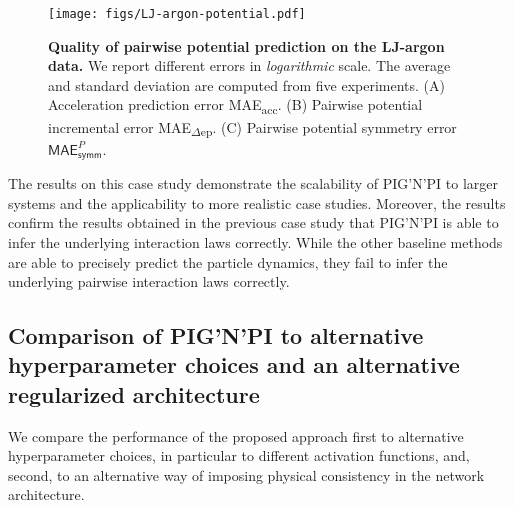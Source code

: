 \documentclass{article}
\newcommand{\pignpi}{PIG'N'PI\xspace}
\begin{document}
\begin{figure}[h!]
    \centering
    \texttt{[image: figs/LJ-argon-potential.pdf]}
    \caption{\textbf{Quality of pairwise potential prediction on the LJ-argon data.} We report different errors in \emph{logarithmic} scale. The average and standard deviation are computed from five experiments. (A) Acceleration prediction error \textsf{MAE\textsubscript{acc}}. (B) Pairwise potential incremental error \textsf{MAE\textsubscript{$\Delta$ep}}. (C) Pairwise potential symmetry error $\textsf{MAE}_\textsf{symm}^{P}$.}
    \label{fig:LJ-argon-potential}
\end{figure}


The results on this case study demonstrate the scalability of \pignpi to larger systems and the applicability to more realistic case studies. Moreover, the results confirm the results obtained in the previous case study that \pignpi is able to infer the underlying interaction laws correctly. While the other baseline methods are able to precisely predict the particle dynamics, they fail to infer the underlying pairwise interaction laws correctly.




\subsection{Comparison of \pignpi to alternative hyperparameter choices and an alternative regularized architecture}
\label{sec:results_pignpi_vs_alternatives}
We compare the performance of the proposed approach first to alternative hyperparameter choices, in particular to different activation functions, and, second, to an alternative way of imposing physical consistency in the network architecture. 

\end{document}
